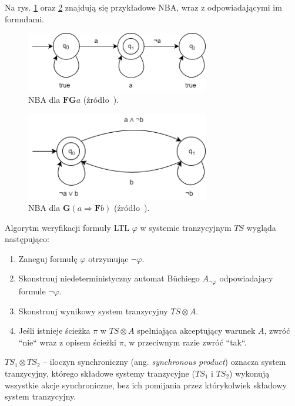 Na rys. \ref{fig:nba1} oraz \ref{fig:nba2} znajdują się przykładowe NBA, wraz z odpowiadającymi im formułami.

\begin{figure}[h]
    \centering
    \includegraphics[width=8cm,keepaspectratio]{img/nba1.png}
    \caption{NBA dla $\mathbf{FG}a$ (źródło~\cite{Bai08}).}
    \label{fig:nba1}
\end{figure}
\begin{figure}[h]
    \centering
    \includegraphics[width=8cm,keepaspectratio]{img/nba2.png}
    \caption{NBA dla $\mathbf{G}(a \Rightarrow \mathbf{F}b)$ (źródło~\cite{Bai08}).}
    \label{fig:nba2}
\end{figure}

\noindent
Algorytm weryfikacji formuły LTL $\varphi$ w systemie tranzycyjnym $TS$ wygląda następująco:
\begin{enumerate}
    \item Zaneguj formułę $\varphi$ otrzymując $\neg\varphi$.
    \item Skonstruuj niedeterministyczny automat Büchiego $A_{\neg\varphi}$ odpowiadający formule $\neg\varphi$.
    \item Skonstruuj wynikowy system tranzycyjny $TS \otimes A$.
    \item Jeśli istnieje ścieżka $\pi$ w $TS \otimes A$ spełniająca akceptujący warunek $A$, zwróć ``nie`` wraz z opisem ścieżki $\pi$, w przeciwnym razie zwróć ``tak``.
\end{enumerate}

\noindent
$TS_1 \otimes TS_2$ -- iloczyn synchroniczny (ang. \textit{synchronous product}) oznacza system tranzycyjny, którego składowe systemy tranzycyjne ($TS_1$ i $TS_2$) wykonują wszystkie akcje synchroniczne, bez ich pomijania przez którykolwiek składowy system tranzycyjny.


